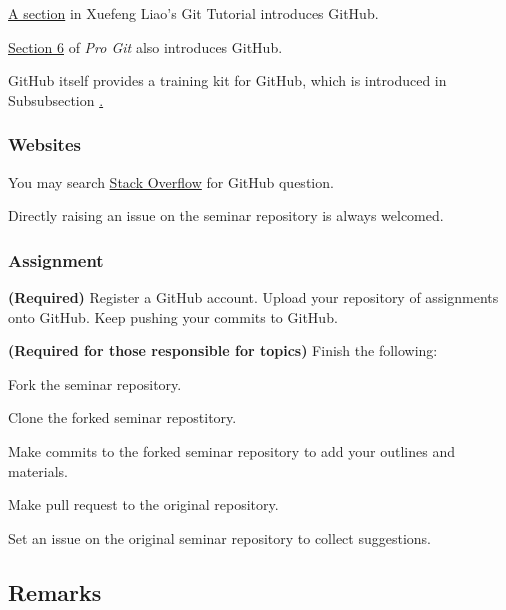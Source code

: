 \documentclass[english]{pkupaper}
\begin{document}
\href{https://www.liaoxuefeng.com/wiki/0013739516305929606dd18361248578c67b8067c8c017b000/00137628548491051ccfaef0ccb470894c858999603fedf000}{A section} in Xuefeng Liao's Git Tutorial introduces GitHub.

\href{https://git-scm.com/book/en/v2/GitHub-Account-Setup-and-Configuration}{Section 6} of \emph{Pro Git} also introduces GitHub.

GitHub itself provides a training kit for GitHub, which is introduced in Subsubsection \href{Sssec:Tuto}.

\subsubsection{Websites}

You may search \href{https://stackoverflow.com/}{Stack Overflow} for GitHub question.

Directly raising an issue on the seminar repository is always welcomed.

\subsubsection{Assignment}

\begin{thmquestion}
\textbf{(Required)} Register a GitHub account. Upload your repository of assignments onto GitHub. Keep pushing your commits to GitHub.
\end{thmquestion}

\begin{thmquestion}
\textbf{(Required for those responsible for topics)} Finish the following:
\begin{partlist}
\item Fork the seminar repository.
\item Clone the forked seminar repostitory.
\item Make commits to the forked seminar repository to add your outlines and materials.
\item Make pull request to the original repository.
\item Set an issue on the original seminar repository to collect suggestions.
\end{partlist}
\end{thmquestion}

\subsection{Remarks}
\end{document}
